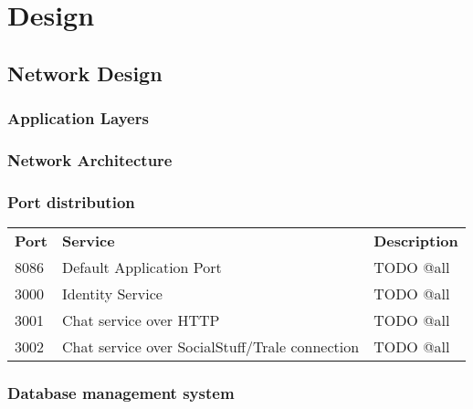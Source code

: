 

\chapter{Design}\label{ch:design}


\section{Network Design}\label{sec:network-design}

\subsection{Application Layers}\label{subsec:application-layers}

\subsection{Network Architecture}\label{subsec:network-architecture}

\subsection{Port distribution}\label{subsec:port-distribution}

\begin{table}[]
    \begin{tabular}{lll}
        \textbf{Port} & \textbf{Service}                               & \textbf{Description} \\
        8086          & Default Application Port                       & TODO @all            \\
        3000          & Identity Service                               & TODO @all            \\
        3001          & Chat service over HTTP                         & TODO @all            \\
        3002          & Chat service over SocialStuff/Trale connection & TODO @all
    \end{tabular}\label{tab:table}
\end{table}

\subsection{Database management system}\label{subsec:database-management-system}

\lipsum[2-4]
